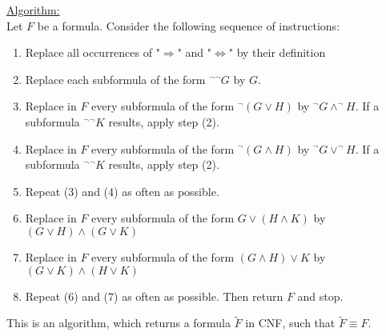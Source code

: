 \documentclass[a4paper]{article}
\newcommand{\ul}{\underline}
\begin{document}
\ul{Algorithm:}\\
Let $F$ be a formula. Consider the following sequence of instructions:
\begin{enumerate}[(1)]
	\item Replace all occurrences of "$\Rightarrow$" and "$\Leftrightarrow$" by their definition
	\item Replace each subformula of the form $^\neg$$^\neg G$ by $G$.
	\item Replace in $F$ every subformula of the form $^\neg (G\vee H)$ by $^\neg G\wedge ^\neg H$. If a subformula $^\neg$$^\neg K$ results, apply step (2).
	\item Replace in $F$ every subformula of the form $^\neg (G\wedge H)$ by $^\neg G\vee ^\neg H$. If a subformula $^\neg$$^\neg K$ results, apply step (2).
	\item Repeat (3) and (4) as often as possible.
	\item Replace in $F$ every subformula of the form $G\vee (H\wedge K)$ by $(G\vee H)\wedge (G\vee K)$
	\item Replace in $F$ every subformula of the form $(G\wedge H)\vee K$ by $(G\vee K)\wedge (H\vee K)$
	\item Repeat (6) and (7) as often as possible. Then return $F$ and stop.
\end{enumerate}
This is an algorithm, which returns a formula $\tilde{F}$ in CNF, such that $\tilde{F}\equiv F$.
\end{document}
